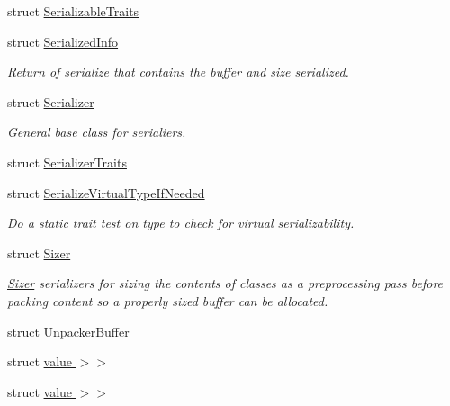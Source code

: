 \begin{DoxyCompactItemize}
struct \hyperlink{structcheckpoint_1_1_serializable_traits}{Serializable\+Traits}
\item 
struct \hyperlink{structcheckpoint_1_1_serialized_info}{Serialized\+Info}
\begin{DoxyCompactList}\small\item\em Return of serialize that contains the buffer and size serialized. \end{DoxyCompactList}\item 
struct \hyperlink{structcheckpoint_1_1_serializer}{Serializer}
\begin{DoxyCompactList}\small\item\em General base class for serialiers. \end{DoxyCompactList}\item 
struct \hyperlink{structcheckpoint_1_1_serializer_traits}{Serializer\+Traits}
\item 
struct \hyperlink{structcheckpoint_1_1_serialize_virtual_type_if_needed}{Serialize\+Virtual\+Type\+If\+Needed}
\begin{DoxyCompactList}\small\item\em Do a static trait test on type to check for virtual serializability. \end{DoxyCompactList}\item 
struct \hyperlink{structcheckpoint_1_1_sizer}{Sizer}
\begin{DoxyCompactList}\small\item\em \hyperlink{structcheckpoint_1_1_sizer}{Sizer} serializers for sizing the contents of classes as a preprocessing pass before packing content so a properly sized buffer can be allocated. \end{DoxyCompactList}\item 
struct \hyperlink{structcheckpoint_1_1_unpacker_buffer}{Unpacker\+Buffer}
\item 
struct \hyperlink{structcheckpoint_1_1_reconstruct_as_virtual_if_needed_3_01_t_00_01_serializer_t_00_01typename_01bd353309780a1641c6b4da6107e9b732}{value $>$$>$}
\item 
struct \hyperlink{structcheckpoint_1_1_reconstruct_as_virtual_if_needed_3_01_t_00_01_serializer_t_00_01typename_0185cb3961b0806c240679cf17dd651016}{value $>$$>$}
\end{DoxyCompactItemize}
